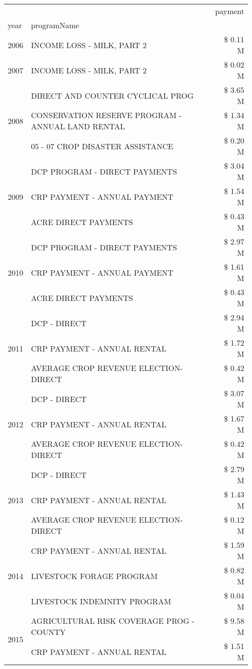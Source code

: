\begin{tabular}{llr}
\toprule
 &  & payment \\
year & programName &  \\
\midrule
2006 & INCOME LOSS - MILK, PART 2 & \$ 0.11 M \\
\cline{1-3}
2007 & INCOME LOSS - MILK, PART 2 & \$ 0.02 M \\
\cline{1-3}
\multirow[t]{3}{*}{2008} & DIRECT AND COUNTER CYCLICAL PROG & \$ 3.65 M \\
 & CONSERVATION RESERVE PROGRAM - ANNUAL LAND RENTAL & \$ 1.34 M \\
 & 05 - 07 CROP DISASTER ASSISTANCE & \$ 0.20 M \\
\cline{1-3}
\multirow[t]{3}{*}{2009} & DCP PROGRAM - DIRECT PAYMENTS & \$ 3.04 M \\
 & CRP PAYMENT - ANNUAL PAYMENT & \$ 1.54 M \\
 & ACRE DIRECT PAYMENTS & \$ 0.43 M \\
\cline{1-3}
\multirow[t]{3}{*}{2010} & DCP PROGRAM - DIRECT PAYMENTS & \$ 2.97 M \\
 & CRP PAYMENT - ANNUAL PAYMENT & \$ 1.61 M \\
 & ACRE DIRECT PAYMENTS & \$ 0.43 M \\
\cline{1-3}
\multirow[t]{3}{*}{2011} & DCP - DIRECT & \$ 2.94 M \\
 & CRP PAYMENT - ANNUAL RENTAL & \$ 1.72 M \\
 & AVERAGE CROP REVENUE ELECTION-DIRECT & \$ 0.42 M \\
\cline{1-3}
\multirow[t]{3}{*}{2012} & DCP - DIRECT & \$ 3.07 M \\
 & CRP PAYMENT - ANNUAL RENTAL & \$ 1.67 M \\
 & AVERAGE CROP REVENUE ELECTION-DIRECT & \$ 0.42 M \\
\cline{1-3}
\multirow[t]{3}{*}{2013} & DCP - DIRECT & \$ 2.79 M \\
 & CRP PAYMENT - ANNUAL RENTAL & \$ 1.43 M \\
 & AVERAGE CROP REVENUE ELECTION-DIRECT & \$ 0.12 M \\
\cline{1-3}
\multirow[t]{3}{*}{2014} & CRP PAYMENT - ANNUAL RENTAL & \$ 1.59 M \\
 & LIVESTOCK FORAGE PROGRAM & \$ 0.82 M \\
 & LIVESTOCK INDEMNITY PROGRAM & \$ 0.04 M \\
\cline{1-3}
\multirow[t]{3}{*}{2015} & AGRICULTURAL RISK COVERAGE PROG - COUNTY & \$ 9.58 M \\
 & CRP PAYMENT - ANNUAL RENTAL & \$ 1.51 M \\

\end{tabular}
